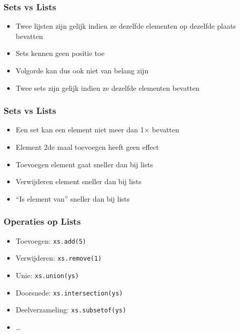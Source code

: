 \begin{frame}
  \frametitle{Sets vs Lists}
  \begin{itemize}
    \item Twee lijsten zijn gelijk indien ze dezelfde elementen op dezelfde plaats bevatten
    \item Sets kennen geen positie toe
    \item Volgorde kan dus ook niet van belang zijn
    \item Twee sets zijn gelijk indien ze dezelfde elementen bevatten
  \end{itemize}
\end{frame}

\begin{frame}
  \frametitle{Sets vs Lists}
  \begin{itemize}
    \item Een set kan een element niet meer dan 1$\times$ bevatten
    \item Element 2de maal toevoegen heeft geen effect
  \end{itemize}
  \vskip2mm
  \begin{itemize}
    \item Toevoegen element gaat sneller dan bij lists
    \item Verwijderen element sneller dan bij lists
    \item ``Is element van'' sneller dan bij lists
  \end{itemize}
\end{frame}

\begin{frame}
  \frametitle{Operaties op Lists}
  \begin{itemize}
    \item Toevoegen: \texttt{xs.add(5)}
    \item Verwijderen: \texttt{xs.remove(1)}
    \item Unie: \texttt{xs.union(ys)}
    \item Doorsnede: \texttt{xs.intersection(ys)}
    \item Deelverzameling: \texttt{xs.subsetof(ys)}
    \item \dots
  \end{itemize}
\end{frame}

